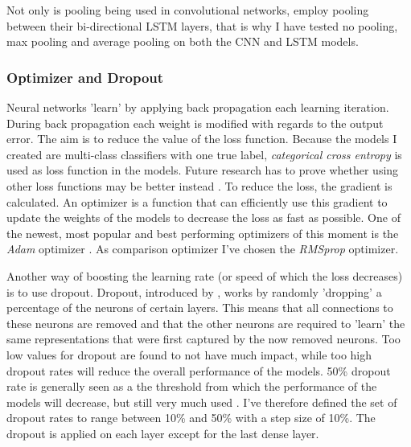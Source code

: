 Not only is pooling being used in convolutional networks, \textcite{Gimeno2020a} employ pooling between their bi-directional LSTM layers, that is why I have tested no pooling, max pooling and average pooling on both the CNN and LSTM models.

\subsubsection{Optimizer and Dropout}
Neural networks 'learn' by applying back propagation each learning iteration. During back propagation each weight is modified with regards to the output error. The aim is to reduce the value of the loss function. Because the models I created are multi-class classifiers with one true label, \textit{categorical cross entropy} is used as loss function in the models. Future research has to prove whether using other loss functions may be better instead \cite{Hsu2019multi}. To reduce the loss, the gradient is calculated. An optimizer is a function that can efficiently use this gradient to update the weights of the models to decrease the loss as fast as possible. One of the newest, most popular and best performing optimizers of this moment is the \textit{Adam} optimizer \cite{Kingma2014adam}. As comparison optimizer I've chosen the \textit{RMSprop} optimizer.

Another way of boosting the learning rate (or speed of which the loss decreases) is to use dropout. Dropout, introduced by \textcite{Hinton2012improving}, works by randomly 'dropping' a percentage of the neurons of certain layers. This means that all connections to these neurons are removed and that the other neurons are required to 'learn' the same representations that were first captured by the now removed neurons. Too low values for dropout are found to not have much impact, while too high dropout rates will reduce the overall performance of the models. 50\% dropout rate is generally seen as a the threshold from which the performance of the models will decrease, but still very much used \cite{Ullrich2014boundary}. I've therefore defined the set of dropout rates to range between 10\% and 50\% with a step size of 10\%. The dropout is applied on each layer except for the last dense layer.

